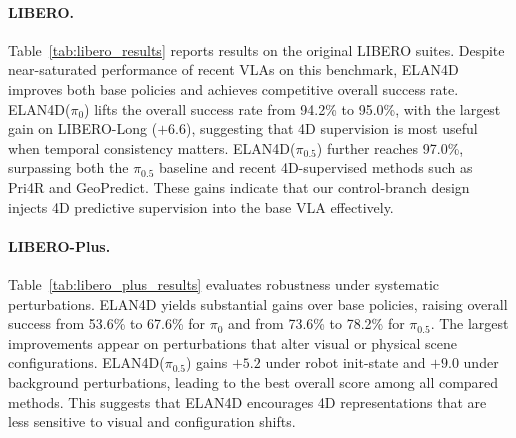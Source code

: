 \paragraph{LIBERO.}
Table~\ref{tab:libero_results} reports results on the original LIBERO suites. 
Despite near-saturated performance of recent VLAs on this benchmark, 
ELAN4D improves both base policies and achieves competitive overall 
success rate. ELAN4D($\pi_0$) lifts the overall success rate from 
94.2\% to 95.0\%, with the largest gain on LIBERO-Long ($+6.6$), suggesting that 4D supervision is most useful when temporal consistency matters.
ELAN4D($\pi_{0.5}$) further reaches 97.0\%, surpassing both the 
$\pi_{0.5}$ baseline and recent 4D-supervised methods such as Pri4R and 
GeoPredict. These gains indicate that our control-branch design injects 
4D predictive supervision into the base VLA effectively.\vspace{-1em}

\paragraph{LIBERO-Plus.}
Table~\ref{tab:libero_plus_results} evaluates robustness under systematic 
perturbations. ELAN4D yields substantial gains over base 
policies, raising overall success from 53.6\% to 67.6\% for $\pi_0$ and from 73.6\% to 78.2\% for $\pi_{0.5}$. The largest improvements appear on perturbations that alter visual or physical scene configurations. ELAN4D($\pi_{0.5}$) gains $+5.2$ under robot init-state and $+9.0$ under background perturbations, leading to the best overall score among all compared methods. This suggests that ELAN4D encourages 4D representations that are less sensitive to visual and configuration shifts.


